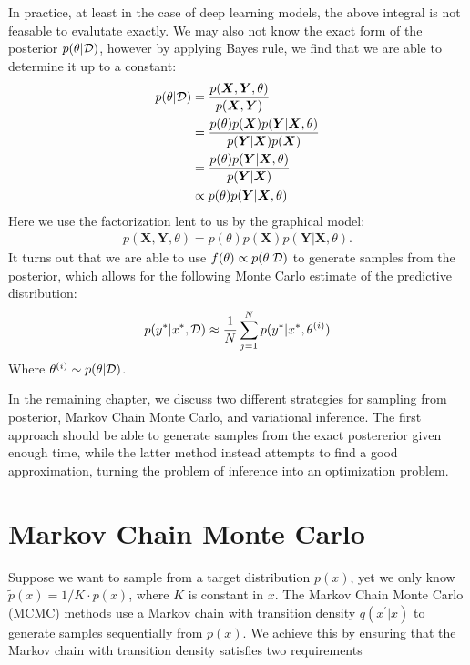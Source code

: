 In practice, at least in the case of deep learning models, the above integral is not feasable to evalutate exactly.
We may also not know the exact form of the posterior $p(\theta|\mathcal{D})$, however by applying Bayes rule, we find that we are able to determine it up to a constant:
\begin{align*}
    p(\theta | \mathcal{D}) 
    &= \frac{p(\bm X , \bm Y, \theta)}{p(\bm{X}, \bm{Y})}\\
    &= \frac{p(\theta) p(\bm X) p(\bm Y | \bm X, \theta)}{p(\bm{Y}|\bm{X})p(\bm{X})} \\
    &= \frac{p(\theta) p(\bm Y | \bm X, \theta)}{p(\bm{Y}|\bm{X})} \\
    &\propto p(\theta) p(\bm Y | \bm X, \theta)
\end{align*}
Here we use the factorization lent to us by the graphical model:
\begin{align*}
    p(\bm X, \bm Y, \theta) = p(\theta) p(\bm X) p(\bm Y | \bm X, \theta).
\end{align*}
It turns out that we are able to use $f(\theta) \propto p(\theta | \mathcal{D})$ to generate samples from the posterior, which allows for the following Monte Carlo estimate of the predictive distribution:
\begin{align*}
    p(y^\ast | x^\ast, \mathcal{D})  \approx \frac{1}{N} \sum_{j=1}^N p(y^\ast | x^\ast, \theta^{(i)}) 
\end{align*}
Where $\theta^{(i)}\sim p(\theta | \mathcal{D})$.

In the remaining chapter, we discuss two different strategies for sampling from posterior, Markov Chain Monte Carlo, and variational inference.
The first approach should be able to generate samples from the exact postererior given enough time, while the latter method instead attempts to find a good approximation, turning the problem of inference into an optimization problem.

\section{Markov Chain Monte Carlo}
Suppose we want to sample from a target distribution $p(x)$, yet we only know $\tilde{p}(x) = 1/K\cdot p(x)$, where $K$ is constant in $x$.
The Markov Chain Monte Carlo (MCMC) methods use a Markov chain with transition density $q(x^\prime | x)$ to generate samples sequentially from $p(x)$. 
We achieve this by ensuring that the Markov chain with transition density satisfies two requirements

